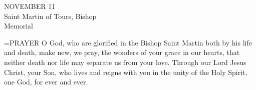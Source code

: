 \begin{center}\normalsize NOVEMBER 11\\
\footnotesize Saint Martin of Tours, Bishop\\
\footnotesize Memorial\\
\end{center}

\hangindent=\parindent \small{PRAYER 
O God, who are glorified in the Bishop Saint Martin
both by his life and death,
make new, we pray,
the wonders of your grace in our hearts,
that neither death nor life
may separate us from your love.
Through our Lord Jesus Christ, your Son,
who lives and reigns with you in the unity of the Holy Spirit,
one God, for ever and ever.\\}
 
